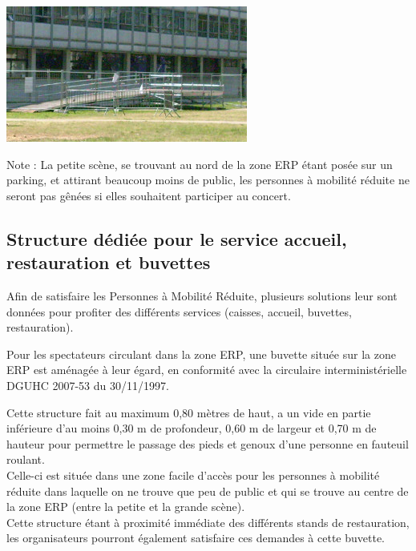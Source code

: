 \documentclass[hidelinks, paper=a4, fontsize=13pt]{report}
\begin{document}
\begin{center}
\includegraphics[scale=1]{Annexes/Images/structurePMR2013}
\end{center}
Note : La petite scène, se trouvant au nord de la zone ERP étant posée sur un parking, et attirant beaucoup moins de public, les personnes à mobilité réduite ne seront pas gênées si elles souhaitent participer au concert.


\subsection{Structure dédiée pour le service accueil, restauration et buvettes}

Afin de satisfaire les Personnes à Mobilité Réduite, plusieurs solutions leur sont données pour profiter des différents services (caisses, accueil, buvettes, restauration).
\begin{list}{•}{}
\item Pour les spectateurs circulant dans la zone ERP, une buvette située sur la zone ERP est aménagée à leur égard, en conformité avec la circulaire interministérielle DGUHC 2007-53 du 30/11/1997.
\end{list}

Cette structure fait au maximum 0,80 mètres de haut, a un vide en partie inférieure d’au moins 0,30 m de profondeur, 0,60 m de largeur et 0,70 m de hauteur pour permettre le passage des pieds et genoux d’une personne en fauteuil roulant.\\

Celle-ci est située dans une zone facile d’accès pour les personnes à mobilité réduite dans laquelle on ne trouve que peu de public et qui se trouve au centre de la zone ERP (entre la petite et la grande scène).\\

Cette structure étant à proximité immédiate des différents stands de restauration, les organisateurs pourront également satisfaire ces demandes à cette buvette.\\
\end{document}
